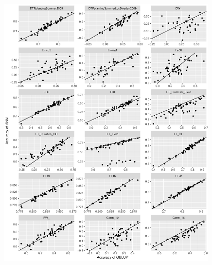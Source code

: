 \begin{figure}[H]
  \centering \includegraphics[height=0.99\textheight, width=0.99\textwidth]{Figures/cor_plots_3}
  \decoRule
 \label{fig:bla}
\end{figure}

